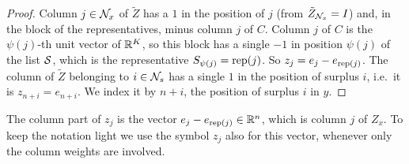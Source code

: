 \begin{proof}
Column $j\in\mathcal{N}_x$ of $\tilde Z$ has a $1$ in the position of $j$ (from $\tilde Z_{\mathcal{N}_x} = I$)
and, in the block of the representatives, minus column $j$ of $C$. Column $j$ of $C$ is the
$\psi(j)$-th unit vector of $\mathbb{R}^K$, so this block has a single $-1$ in position $\psi(j)$ of the
list $\mathcal{S}$, which is the representative $S_{\psi(j)} = \operatorname{rep}(j)$. So $z_j = e_j - e_{\operatorname{rep}(j)}$.
The column of $\tilde Z$ belonging to $i\in\mathcal{N}_s$ has a single $1$ in the position of surplus $i$,
i.e.\ it is $z_{n+i} = e_{n+i}$. We index it by $n+i$, the position of surplus $i$ in $y$.
\end{proof}

\begin{note}
The column part of $z_j$ is the vector $e_j - e_{\operatorname{rep}(j)}\in\mathbb{R}^n$, which is column $j$ of
$Z_x$. To keep the notation light we use the symbol $z_j$ also for this vector, whenever only
the column weights are involved.
\end{note}

